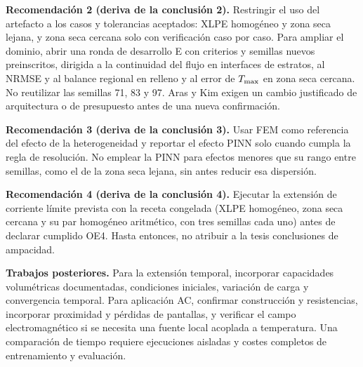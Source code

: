 \textbf{Recomendación 2 (deriva de la conclusión 2).} Restringir el uso del artefacto a los casos y tolerancias aceptados: XLPE homogéneo y zona seca lejana, y zona seca cercana solo con verificación caso por caso. Para ampliar el dominio, abrir una ronda de desarrollo E con criterios y semillas nuevos preinscritos, dirigida a la continuidad del flujo en interfaces de estratos, al NRMSE y al balance regional en relleno y al error de $T_{\max}$ en zona seca cercana. No reutilizar las semillas 71, 83 y 97. Aras y Kim exigen un cambio justificado de arquitectura o de presupuesto antes de una nueva confirmación.

\textbf{Recomendación 3 (deriva de la conclusión 3).} Usar FEM como referencia del efecto de la heterogeneidad y reportar el efecto PINN solo cuando cumpla la regla de resolución. No emplear la PINN para efectos menores que su rango entre semillas, como el de la zona seca lejana, sin antes reducir esa dispersión.

\textbf{Recomendación 4 (deriva de la conclusión 4).} Ejecutar la extensión de corriente límite prevista con la receta congelada (XLPE homogéneo, zona seca cercana y su par homogéneo aritmético, con tres semillas cada uno) antes de declarar cumplido OE4. Hasta entonces, no atribuir a la tesis conclusiones de ampacidad.

\textbf{Trabajos posteriores.} Para la extensión temporal, incorporar capacidades volumétricas documentadas, condiciones iniciales, variación de carga y convergencia temporal. Para aplicación AC, confirmar construcción y resistencias, incorporar proximidad y pérdidas de pantallas, y verificar el campo electromagnético si se necesita una fuente local acoplada a temperatura. Una comparación de tiempo requiere ejecuciones aisladas y costes completos de entrenamiento y evaluación.
